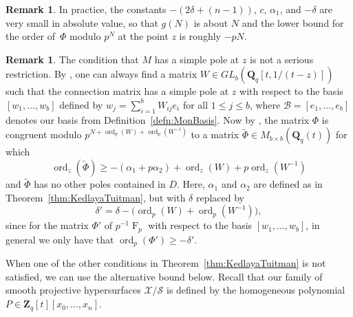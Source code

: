 \documentclass[a4paper,11pt]{article}
\numberwithin{equation}{section}
\newcommand{\ZZ}{\mathbf{Z}} %
\newcommand{\QQ}{\mathbf{Q}} %
\DeclareMathOperator{\ord}{ord}          %
\DeclareMathOperator{\Frob}{F}           %
\providecommand{\cB}{\mathcal{B}} %
\theoremstyle{definition}
\newtheorem{rem}[thm]{Remark}
\begin{document}
\begin{rem}
In practice, the constants $-(2 \delta + (n-1))$, $c$, $\alpha_1$, and $-\delta$ 
are very small in absolute value, so that $g(N)$ is about $N$ and 
the lower bound for the order of~$\Phi$ modulo $p^N$ at the point $z$ is 
roughly $-pN$.
\end{rem}

\begin{rem} \label{rem:basischange}
The condition that $M$ has a simple pole at $z$ is not a serious restriction. 
By \citep[Theorem 2.1]{Lauder2011}, one can always find a matrix $W \in GL_{b}(\QQ_q[t,1/(t-z)])$
such that the connection matrix has a simple pole at $z$ with respect to the basis 
$[w_1, \dotsc, w_b]$ defined by $w_j = \sum_{i=1}^b W_{ij} e_i$ for all 
$1 \leq j \leq b$, where $\cB=[e_1,\dotsc,e_b]$ denotes our basis from 
Definition~\ref{defn:MonBasis}. Now by \citep[Corollary 2.6]{KedlayaTuitman2012}, 
the matrix $\Phi$ is congruent modulo $p^{N+\ord_p(W)+\ord_p(W^{-1})}$ 
to a matrix $\tilde{\Phi} \in M_{b \times b}(\QQ_q(t))$ for which
\[
\ord_z(\tilde{\Phi}) \geq -(\alpha_1+p \alpha_2)+\ord_z(W)+p\ord_z(W^{-1})
\]
and $\tilde{\Phi}$ has no other poles contained in $D$.
Here, $\alpha_1$ and $\alpha_2$ are defined as in 
Theorem~\ref{thm:KedlayaTuitman}, but with $\delta$ replaced by
\begin{equation*}
\delta' = \delta-\bigl(\ord_p(W)+\ord_p(W^{-1})\bigr), 
\end{equation*}
since for the matrix $\Phi'$ of $p^{-1}\Frob_p$ with respect to the basis 
$[w_1,\dotsc,w_b]$, in general we only have that $\ord_p(\Phi') \geq -\delta'$. 
\end{rem}

When one of the other conditions in Theorem~\ref{thm:KedlayaTuitman} is not satisfied, 
we can use the alternative bound below. Recall that our family of 
smooth projective hypersurfaces $\mathcal{X}/\mathcal{S}$ is defined by the homogeneous 
polynomial $P \in \ZZ_q[t][x_0,\dotsc,x_n]$.
\end{document}
